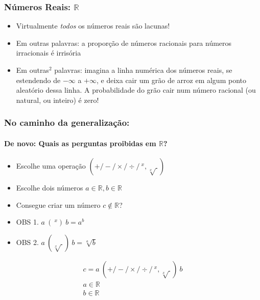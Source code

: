 \documentclass[usenames,dvipsnames,svgnames]{beamer}
\begin{document}
\begin{frame}	
	\frametitle{Números Reais: $\mathbb{R}$}

	\begin{itemize}
		\item Virtualmente \emph{todos} os números reais são lacunas!
		\item Em outras palavras: a proporção de números racionais para números irracionais é irrisória
		\item Em outras$^2$ palavras: imagina a linha numérica dos números reais, se estendendo de $-\infty$ a $+\infty$, e deixa cair um grão de arroz em algum ponto aleatório dessa linha. A probabilidade do grão cair num número racional (ou natural, ou inteiro) é zero!
	\end{itemize}
\end{frame}

\begin{frame}	
	\frametitle{No caminho da generalização:}
	\framesubtitle{De novo: Quais as perguntas proibidas em $\mathbb{R}$?}

	\begin{itemize}
		\item Escolhe uma operação $(+ / - / \times / \div / ~^x, \sqrt[x]{~})$
		\item Escolhe dois números $a \in \mathbb{R}, b \in \mathbb{R}$
		\item Consegue criar um número $c \not \in \mathbb{R}$?
		\item OBS 1. $a ~(~^x)~ b = a^b$
		\item OBS 2. $a ~(\sqrt[x]{~})~ b = \sqrt[a]{b}$
	\end{itemize}

	\begin{equation}
	\begin{aligned}
		c = a ~ (+ / - / \times / \div / ~^x, \sqrt[x]{~}) ~ b \\
		a \in \mathbb{R} \\
		b \in \mathbb{R}
	\end{aligned}
	\end{equation}

\end{frame}
\end{document}
